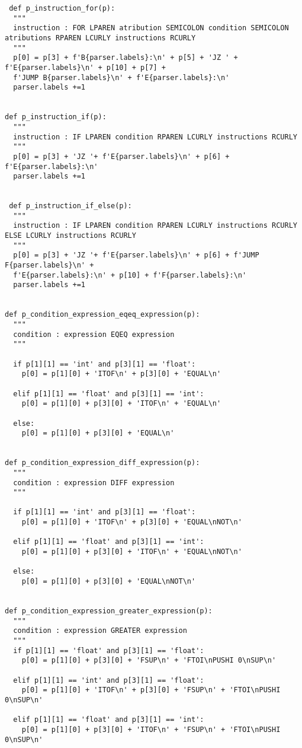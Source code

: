 \documentclass[11pt,a4paper]{report}%
\begin{document}
\begin{scriptsize}
\begin{verbatim}
 def p_instruction_for(p):
  """
  instruction : FOR LPAREN atribution SEMICOLON condition SEMICOLON atributions RPAREN LCURLY instructions RCURLY
  """
  p[0] = p[3] + f'B{parser.labels}:\n' + p[5] + 'JZ ' + f'E{parser.labels}\n' + p[10] + p[7] + 
  f'JUMP B{parser.labels}\n' + f'E{parser.labels}:\n' 
  parser.labels +=1


def p_instruction_if(p):
  """
  instruction : IF LPAREN condition RPAREN LCURLY instructions RCURLY
  """
  p[0] = p[3] + 'JZ '+ f'E{parser.labels}\n' + p[6] + f'E{parser.labels}:\n' 
  parser.labels +=1


 def p_instruction_if_else(p):
  """
  instruction : IF LPAREN condition RPAREN LCURLY instructions RCURLY ELSE LCURLY instructions RCURLY
  """
  p[0] = p[3] + 'JZ '+ f'E{parser.labels}\n' + p[6] + f'JUMP F{parser.labels}\n' +
  f'E{parser.labels}:\n' + p[10] + f'F{parser.labels}:\n' 
  parser.labels +=1

  
def p_condition_expression_eqeq_expression(p):
  """
  condition : expression EQEQ expression
  """

  if p[1][1] == 'int' and p[3][1] == 'float':
    p[0] = p[1][0] + 'ITOF\n' + p[3][0] + 'EQUAL\n'
  
  elif p[1][1] == 'float' and p[3][1] == 'int':
    p[0] = p[1][0] + p[3][0] + 'ITOF\n' + 'EQUAL\n'

  else:
    p[0] = p[1][0] + p[3][0] + 'EQUAL\n'
  

def p_condition_expression_diff_expression(p):
  """
  condition : expression DIFF expression
  """

  if p[1][1] == 'int' and p[3][1] == 'float':
    p[0] = p[1][0] + 'ITOF\n' + p[3][0] + 'EQUAL\nNOT\n'
  
  elif p[1][1] == 'float' and p[3][1] == 'int':
    p[0] = p[1][0] + p[3][0] + 'ITOF\n' + 'EQUAL\nNOT\n'

  else:
    p[0] = p[1][0] + p[3][0] + 'EQUAL\nNOT\n'


def p_condition_expression_greater_expression(p):
  """
  condition : expression GREATER expression
  """
  if p[1][1] == 'float' and p[3][1] == 'float':
    p[0] = p[1][0] + p[3][0] + 'FSUP\n' + 'FTOI\nPUSHI 0\nSUP\n'

  elif p[1][1] == 'int' and p[3][1] == 'float':
    p[0] = p[1][0] + 'ITOF\n' + p[3][0] + 'FSUP\n' + 'FTOI\nPUSHI 0\nSUP\n'
  
  elif p[1][1] == 'float' and p[3][1] == 'int':
    p[0] = p[1][0] + p[3][0] + 'ITOF\n' + 'FSUP\n' + 'FTOI\nPUSHI 0\nSUP\n'


\end{verbatim}
\end{scriptsize}
\end{document}
